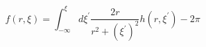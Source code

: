 \begin{equation}
f(r,\xi) = \int_{-\infty}^{\xi}d\xi^\prime \frac{2r}{r^2+(\xi^\prime)^2}
h(r,\xi^\prime) - 2\pi
\end{equation}

